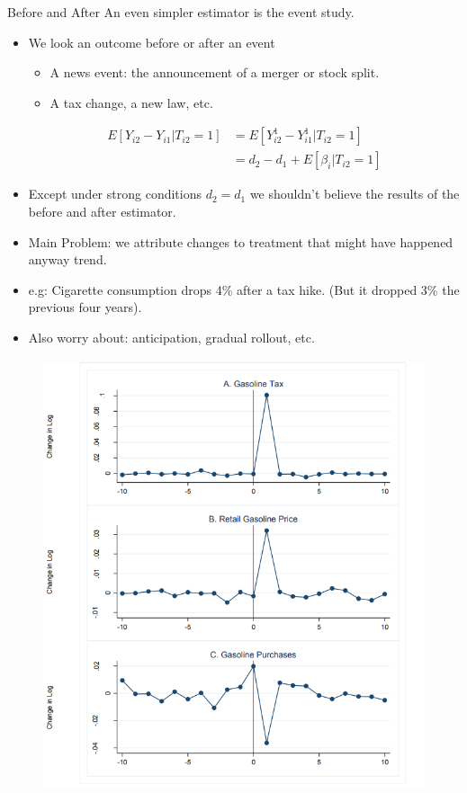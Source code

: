 \begin{frame}{Before and After} 
An even simpler estimator is the \alert{event study}.
\begin{itemize}
\item We look an outcome before or after an event
\begin{itemize}
\item A news event: the announcement of a merger or stock split.
\item A tax change, a new law, etc.
\end{itemize}
\begin{align*}
E[Y_{i2} - Y_{i1} | T_{i2}=1] & = E[Y_{i2}^1 - Y_{i1}^1 | T_{i2}=1] \\
 &= d_2-d_1 + E[\beta_{i}| T_{i2}=1] 
\end{align*}
\item Except under strong conditions $d_2 = d_1$ we shouldn't believe the results of the before and after estimator.
\item Main Problem: we attribute changes to treatment that might have happened anyway \alert{trend}.
\item e.g: Cigarette consumption drops 4\% after a tax hike. (But it dropped 3\% the previous four years).
\item Also worry about: \alert{anticipation}, \alert{gradual rollout}, etc.
\end{itemize}
\end{frame}

\begin{frame}
  \vspace{-10pt}
  \begin{figure}
  \centering
  \includegraphics[height=1.05\textheight]{./resources/gasTaxes}
  \end{figure}
\end{frame}


